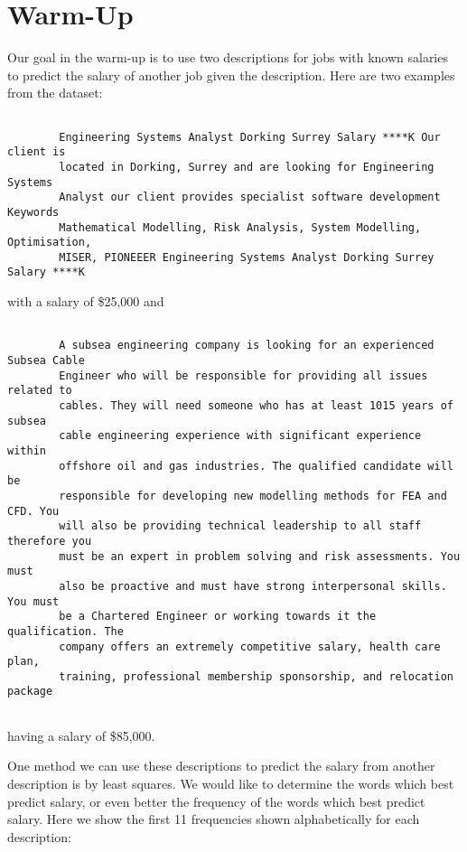 \documentclass[12pt]{article}
\begin{document}
\section{Warm-Up}

    Our goal in the warm-up is to use two descriptions for jobs with known
    salaries to predict the salary of another job given the description. Here
    are two examples from the dataset: 
    
    \begin{lstlisting}

        Engineering Systems Analyst Dorking Surrey Salary ****K Our client is
        located in Dorking, Surrey and are looking for Engineering Systems
        Analyst our client provides specialist software development Keywords
        Mathematical Modelling, Risk Analysis, System Modelling, Optimisation,
        MISER, PIONEEER Engineering Systems Analyst Dorking Surrey Salary ****K

    \end{lstlisting}

    with a salary of \$25,000 and 

    \begin{lstlisting}

        A subsea engineering company is looking for an experienced Subsea Cable
        Engineer who will be responsible for providing all issues related to
        cables. They will need someone who has at least 1015 years of subsea
        cable engineering experience with significant experience within
        offshore oil and gas industries. The qualified candidate will be
        responsible for developing new modelling methods for FEA and CFD. You
        will also be providing technical leadership to all staff therefore you
        must be an expert in problem solving and risk assessments. You must
        also be proactive and must have strong interpersonal skills. You must
        be a Chartered Engineer or working towards it the qualification. The
        company offers an extremely competitive salary, health care plan,
        training, professional membership sponsorship, and relocation package
    
    \end{lstlisting} having a salary of \$85,000.

    One method we can use these descriptions to predict the salary from another
    description is by least squares. We would like to determine the words which
    best predict salary, or even better the frequency of the words which best
    predict salary. Here we show the first 11 frequencies shown alphabetically
    for each description:
\end{document}
